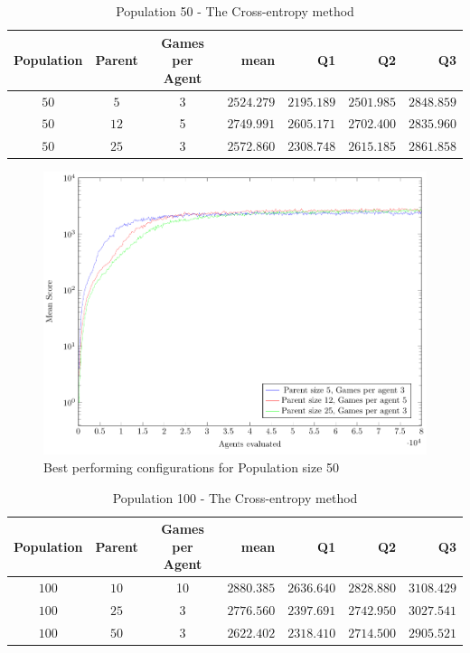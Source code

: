 \clearpage

\begin{table}[H]
\centering
\small
\begin{tabular}{c c c r r r r}
Population & Parent & Games per Agent & mean & Q1 & Q2 & Q3\\
\hline
$50$ & $5$ & 3 & $2524.279$ & $2195.189$ & $2501.985$ & $2848.859$\\
$50$ & $12$ & 5 & $2749.991$ & $2605.171$ & $2702.400$ & $2835.960$\\
$50$ & $25$ & 3 & $2572.860$ & $2308.748$ & $2615.185$ & $2861.858$\\
\end{tabular}
\caption{Population 50 - The Cross-entropy method}
\end{table}

\begin{figure}[H]
\centering
\includegraphics[scale=1]{data/ce_population_offspring/bestofeach_population/50x/PlotFile.pdf}
\caption{Best performing configurations for Population size 50}
\end{figure}

\clearpage

\begin{table}[H]
\centering
\small
\begin{tabular}{c c c r r r r}
Population & Parent & Games per Agent & mean & Q1 & Q2 & Q3\\
\hline
$100$ & $10$ & 10 & $2880.385$ & $2636.640$ & $2828.880$ & $3108.429$\\
$100$ & $25$ & 3 & $2776.560$ & $2397.691$ & $2742.950$ & $3027.541$\\
$100$ & $50$ & 3 & $2622.402$ & $2318.410$ & $2714.500$ & $2905.521$\\
\end{tabular}
\caption{Population 100 - The Cross-entropy method}
\end{table}


